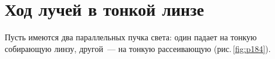 \documentclass[main.tex]{subfiles}
\begin{document}

 

 

\setcounter{section}{6
}
\addtocounter{section}{-1} 

\section{Ход лучей в тонкой линзе}



Пусть имеются два параллельных пучка света: один падает на тонкую собирающую линзу, другой~---  на тонкую рассеивающую (рис.\,\ref{fig:p184}).
\end{document}
